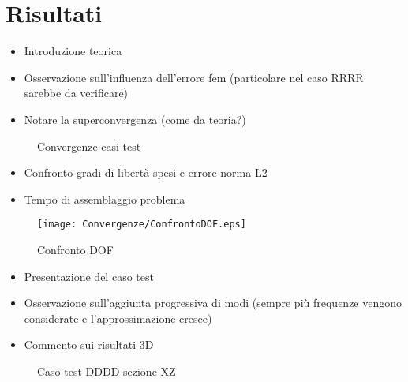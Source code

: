 \chapter{Risultati}

\begin{itemize}
\item Introduzione teorica
\item Osservazione sull'influenza dell'errore fem (particolare nel caso RRRR sarebbe da verificare)
\item Notare la superconvergenza (come da teoria?)
\end{itemize}

\begin{figure}[!htbp]
        \centering%
        \qquad
        \qquad
		\qquad
        \label{fig: convergenze}
        \caption{Convergenze casi test}
\end{figure}

\begin{itemize}
\item Confronto gradi di libert\`a spesi e errore norma L2
\item Tempo di assemblaggio problema
\end{itemize}
\begin{figure}[!h]
\centering
          \texttt{[image: Convergenze/ConfrontoDOF.eps]}\qquad
        \caption{ Confronto DOF}
        \label{fig: Confronto DOF}
\end{figure}

\begin{itemize}
\item Presentazione del caso test
\item Osservazione sull'aggiunta progressiva di modi (sempre pi\`u frequenze vengono considerate e l'approssimazione cresce)
\item Commento sui risultati 3D
\end{itemize}

\begin{figure}[!htbp]
        \centering%
        \qquad
        \qquad
		\qquad
          \qquad
        \caption{Caso test DDDD sezione XZ}
        \label{fig:DDDD_ADR slice}
\end{figure}

